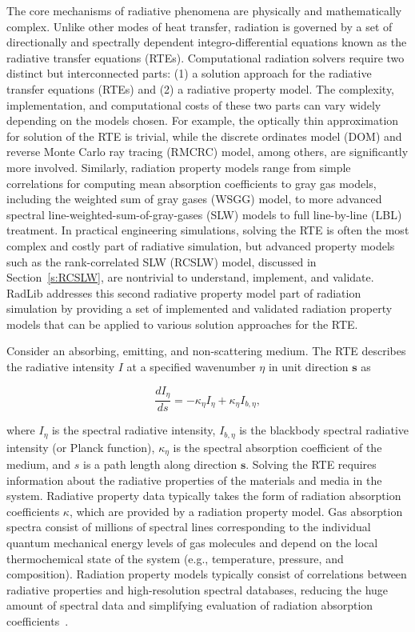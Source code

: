 \documentclass[preprint,12pt]{elsarticle}
\newcounter{bla}
\begin{document}
    The core mechanisms of radiative phenomena are physically and mathematically complex. Unlike other modes of heat
    transfer, radiation is governed by a set of directionally and spectrally dependent integro-differential equations
    known as the radiative transfer
    equations (RTEs). Computational radiation solvers require two distinct
    but interconnected parts: (1) a solution approach for the radiative transfer equations (RTEs) and (2) a radiative
    property model.
    The complexity, implementation, and computational costs of these two parts can vary widely depending on the models
    chosen. For example, the optically thin approximation for solution of the RTE is trivial, while the discrete
    ordinates model (DOM) and
    reverse Monte Carlo ray tracing (RMCRC) model, among others, are significantly more involved. Similarly,
    radiation property models range from simple correlations for computing mean absorption coefficients to gray gas
    models, including the weighted sum of gray gases (WSGG) model, to more advanced spectral
    line-weighted-sum-of-gray-gases (SLW) models to full line-by-line (LBL) treatment.
    In practical engineering simulations, solving the RTE is
    often the most complex and costly part of radiative simulation, but advanced property models such as the
    rank-correlated SLW (RCSLW) model, discussed in Section~\ref{s:RCSLW}, are nontrivial to understand, implement, and
    validate.
    RadLib addresses this second radiative property model part of radiation simulation by providing a set of
    implemented and validated radiation property models that can be applied to various solution approaches for the RTE.

    Consider an absorbing, emitting, and non-scattering medium. The RTE describes the radiative intensity $I$ at a
    specified wavenumber $\eta$ in unit direction $\mathbf{s}$ as
% 
    \begin{linenomath}
        \begin{equation}
            \label{e:RTE_general}
            \frac{dI_{\eta}}{ds} = -\kappa_{\eta}I_{\eta} + \kappa_{\eta}I_{b,\eta},
        \end{equation}
    \end{linenomath}
%
    where $I_{\eta}$ is the spectral radiative intensity, $I_{b,\eta}$ is the blackbody spectral radiative intensity
    (or Planck function), $\kappa_{\eta}$ is the spectral absorption coefficient of the medium, and $s$ is a path length
    along direction $\mathbf{s}$. Solving the RTE requires information about the radiative properties of the
    materials and media in the system. Radiative property data typically takes the form of radiation absorption
    coefficients $\kappa$, which are provided by a radiation property model.
    Gas absorption spectra consist of millions of spectral lines corresponding to the individual quantum mechanical energy levels of gas molecules and depend
    on the local thermochemical state of the system (e.g., temperature, pressure, and composition).
    Radiation property models typically consist of correlations between radiative properties and high-resolution
    spectral databases, reducing the huge amount of spectral data and
    simplifying evaluation of radiation absorption coefficients~\cite{Zhang_2002b}.
\end{document}
